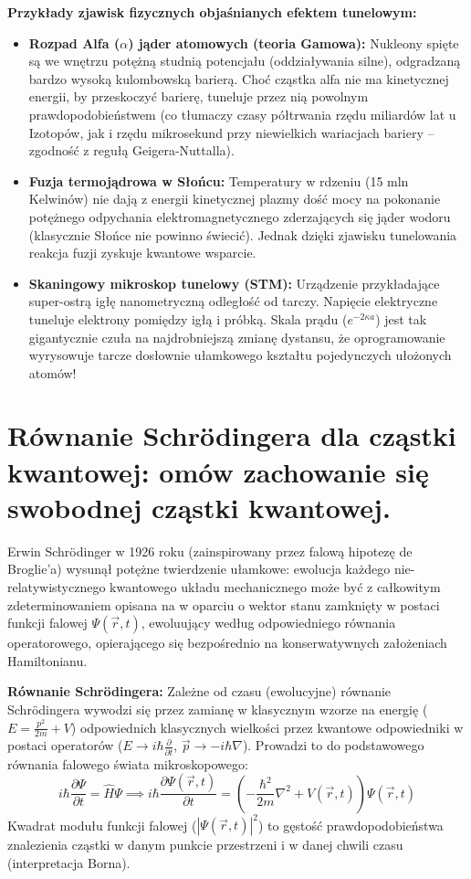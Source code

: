 \documentclass[11pt, a4paper]{article}
\begin{document}
\textbf{Przykłady zjawisk fizycznych objaśnianych efektem tunelowym:}
\begin{itemize}
    \item \textbf{Rozpad Alfa ($\alpha$) jąder atomowych (teoria Gamowa):} Nukleony spięte są we wnętrzu potężną studnią potencjału (oddziaływania silne), odgradzaną bardzo wysoką kulombowską barierą. Choć cząstka alfa nie ma kinetycznej energii, by przeskoczyć barierę, tuneluje przez nią powolnym prawdopodobieństwem (co tłumaczy czasy półtrwania rzędu miliardów lat u Izotopów, jak i rzędu mikrosekund przy niewielkich wariacjach bariery – zgodność z regułą Geigera-Nuttalla).
    \item \textbf{Fuzja termojądrowa w Słońcu:} Temperatury w rdzeniu (15 mln Kelwinów) nie dają z energii kinetycznej plazmy dość mocy na pokonanie potężnego odpychania elektromagnetycznego zderzających się jąder wodoru (klasycznie Słońce nie powinno świecić). Jednak dzięki zjawisku tunelowania reakcja fuzji zyskuje kwantowe wsparcie.
    \item \textbf{Skaningowy mikroskop tunelowy (STM):} Urządzenie przykładające super-ostrą igłę nanometryczną odległość od tarczy. Napięcie elektryczne tuneluje elektrony pomiędzy igłą i próbką. Skala prądu ($e^{-2\kappa a}$) jest tak gigantycznie czuła na najdrobniejszą zmianę dystansu, że oprogramowanie wyrysowuje tarcze dosłownie ułamkowego kształtu pojedynczych ułożonych atomów!
\end{itemize}

\section{Równanie Schrödingera dla cząstki kwantowej: omów zachowanie się swobodnej cząstki kwantowej.}

Erwin Schrödinger w 1926 roku (zainspirowany przez falową hipotezę de Broglie'a) wysunął potężne twierdzenie ułamkowe: ewolucja każdego nie-relatywistycznego kwantowego układu mechanicznego może być z całkowitym zdeterminowaniem opisana na w oparciu o wektor stanu zamknięty w postaci funkcji falowej $\Psi(\vec{r}, t)$, ewoluujący według odpowiedniego równania operatorowego, opierającego się bezpośrednio na konserwatywnych założeniach Hamiltonianu.

\textbf{Równanie Schrödingera:}
Zależne od czasu (ewolucyjne) równanie Schrödingera wywodzi się przez zamianę w klasycznym wzorze na energię ($E = \frac{p^2}{2m} + V$) odpowiednich klasycznych wielkości przez kwantowe odpowiedniki w postaci operatorów ($E \to i\hbar \frac{\partial}{\partial t}$, $\vec{p} \to -i\hbar \nabla$). Prowadzi to do podstawowego równania falowego świata mikroskopowego:
\[
i\hbar \frac{\partial \Psi}{\partial t} = \hat{H} \Psi \implies i\hbar \frac{\partial \Psi(\vec{r}, t)}{\partial t} = \left( -\frac{\hbar^2}{2m}\nabla^2 + V(\vec{r}, t) \right) \Psi(\vec{r}, t)
\]
Kwadrat modułu funkcji falowej ($|\Psi(\vec{r}, t)|^2$) to gęstość prawdopodobieństwa znalezienia cząstki w danym punkcie przestrzeni i w danej chwili czasu (interpretacja Borna).
\end{document}
